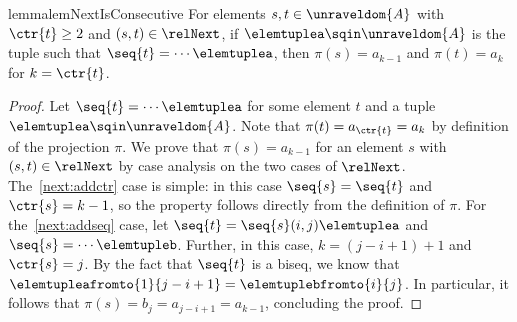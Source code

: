 \ifmainpart
\begin{restatable}{lemma}{lemNextIsConsecutive}\label{lem:next-is-consecutive}
For elements $s, t \in \unraveldom{A}$ with $\ctr{t} \ge 2$ and $(s,t) \in \relNext$, if $\elemtuplea \sqin \unraveldom{A}$ is the tuple such that $\seq{t} = \cdots \elemtuplea$, then $\pi(s) = a_{k-1}$ and $\pi(t) = a_{k}$ for $k = \ctr{t}$.
\end{restatable}
\fi
\ifmainpart
\begin{proof}
  Let $\seq{t} = \cdots{}\elemtuplea$ for some element $t$ and a tuple $\elemtuplea \sqin \unraveldom{A}$.
  Note that $\pi(t) = a_{\ctr{t}} = a_{k}$ by definition of the projection $\pi$.
  We prove that $\pi(s) = a_{k-1}$ for an element $s$ with $(s,t) \in \relNext$ by case analysis on the two cases of $\relNext$.
  The~\ref{next:addctr} case is simple: in this case $\seq{s} = \seq{t}$ and $\ctr{s} = k - 1$, so the property follows directly from the definition of $\pi$.
  For the~\ref{next:addseq} case, let $\seq{t} = \seq{s} (i,j) \elemtuplea$ and $\seq{s} = \cdots \elemtupleb$.
  Further, in this case, $k = (j - i + 1) + 1$ and $\ctr{s} = j$.
  By the fact that $\seq{t}$ is a biseq, we know that $\elemtupleafromto{1}{j-i+1} = \elemtuplebfromto{i}{j}$.
  In particular, it follows that $\pi(s) = b_{j} = a_{j-i+1} = a_{k-1}$, concluding the proof.
\end{proof}
\fi
